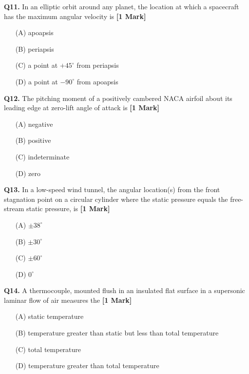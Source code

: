 \documentclass[11pt]{article}
\newcommand{\questiona}[2]{
    \noindent\textbf{Q#2.} #1 \hfill \textbf{[1 Mark]}
}
\begin{document}
\vspace{0.5cm}

\questiona{In an elliptic orbit around any planet, the location at which a spacecraft has the maximum angular velocity is}{11}
\begin{enumerate}
    \item[(A)] apoapsis  
    \item[(B)] periapsis  
    \item[(C)] a point at $+45^\circ$ from periapsis  
    \item[(D)] a point at $-90^\circ$ from apoapsis  
\end{enumerate}

\vspace{0.5cm}

\questiona{The pitching moment of a positively cambered NACA airfoil about its leading edge at zero-lift angle of attack is}{12}
\begin{enumerate}
    \item[(A)] negative  
    \item[(B)] positive  
    \item[(C)] indeterminate  
    \item[(D)] zero  
\end{enumerate}

\vspace{0.5cm}

\questiona{In a low-speed wind tunnel, the angular location(s) from the front stagnation point on a circular cylinder where the static pressure equals the free-stream static pressure, is}{13}
\begin{enumerate}
    \item[(A)] $\pm 38^\circ$  
    \item[(B)] $\pm 30^\circ$  
    \item[(C)] $\pm 60^\circ$  
    \item[(D)] $0^\circ$  
\end{enumerate}

\vspace{0.5cm}

\questiona{A thermocouple, mounted flush in an insulated flat surface in a supersonic laminar flow of air measures the}{14}
\begin{enumerate}
    \item[(A)] static temperature  
    \item[(B)] temperature greater than static but less than total temperature  
    \item[(C)] total temperature  
    \item[(D)] temperature greater than total temperature  
\end{enumerate}
\end{document}

